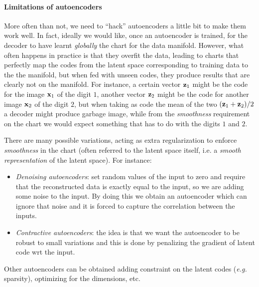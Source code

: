 \paragraph{Limitations of autoencoders}

More often than not, we need to ``hack'' autoencoders a little bit to make them work well. In fact, ideally we would like, once an autoencoder is trained, for the decoder to have learnt \emph{globally} the chart for the data manifold. However, what often happens in practice is that they overfit the data, leading to charts that perfectly map the codes from the latent space corresponding to training data to the the manifold, but when fed with unseen codes, they produce results that are clearly not on the manifold. For instance, a certain vector $\vb{z}_1$ might be the code for the image $\vb{x}_1$ of the digit $1$, another vector $\vb{z}_2$ might be the code for another image $\vb{x}_2$ of the digit $2$, but when taking as code the mean of the two $(\vb{z}_1 + \vb{z}_2) / 2$ a decoder might produce garbage image, while from the \emph{smoothness} requirement on the chart we would expect something that has to do with the digits $1$ and $2$.

There are many possible variations, acting as extra regularization to enforce \emph{smoothness} in the chart (often referred to the latent space itself, i.e. a \emph{smooth representation} of the latent space). For instance:
\begin{itemize}
	\item \emph{Denoising autoencoders}: set random values of the input to zero and require that the reconstructed data is exactly equal to the input, so we are adding some noise to the input. By doing this we obtain an autoencoder which can ignore that noise and it is forced to capture the correlation between the inputs.
	\item \emph{Contractive autoencoders}: the idea is that we want the autoencoder to be robust to small variations and this is done by penalizing the gradient of latent code wrt the input.
\end{itemize}
Other autoencoders can be obtained adding constraint on the latent codes (\textit{e.g.} sparsity), optimizing for the dimensions, etc.
